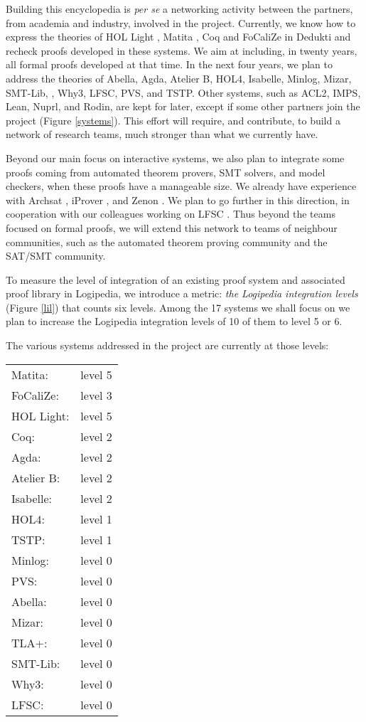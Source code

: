 Building this encyclopedia is {\em per se} a networking activity
between the partners, from academia and industry, involved in the
project.  Currently, we know how to express the theories of {\sc HOL
  Light} \cite{Assaf12}, {\sc Matita} \cite{Assaf15}, {\sc Coq} and
{\sc FoCaliZe} \cite{Cauderlier16} in {\sc Dedukti} and recheck proofs
developed in these systems.  We aim at including, in twenty years, all
formal proofs developed at that time.
In the next four years, we plan to address the theories of {\sc
  Abella}, {\sc Agda}, {\sc Atelier B}, {\sc HOL4}, {\sc Isabelle},
{\sc Minlog}, {\sc Mizar}, {\sc SMT-Lib}, \tlaplus, {\sc Why3}, {\sc
  LFSC}, {\sc PVS}, and {\sc TSTP}.  Other systems, such as {\sc
  ACL2}, {\sc IMPS}, {\sc Lean}, {\sc Nuprl}, and {\sc Rodin}, are
kept for later, except if some other partners join the project (Figure
\ref{systems}). This effort will require, and contribute, to build a
network of research teams, much stronger than what we currently have.

Beyond our main focus on interactive systems, we also plan to
integrate some proofs coming from automated theorem provers, SMT
solvers, and model checkers, when these proofs have a manageable
size. We already have experience with Archsat \cite{Bury19}, iProver
\cite{Burel10}, and Zenon \cite{CauderlierHalmagrand15}. We plan to go
further in this direction, in cooperation with our colleagues working
on LFSC \cite{Stump09}. Thus beyond the teams focused on formal proofs, we
will extend this network to teams of neighbour communities, such as
the automated theorem proving community and the SAT/SMT community.

To measure the level of integration of an existing proof system and
associated proof library in {\sc Logipedia}, we introduce a metric:
{\em the {\sc Logipedia} integration levels} (Figure \ref{lil}) that
counts six levels.  Among the 17 systems we shall focus on we plan to
increase the {\sc Logipedia} integration levels of 10 of them to level
5 or 6.

The various systems addressed in the project are currently at those levels:

\begin{tabular}{ll}
Matita:& level 5\\
FoCaliZe:& level 3\\
HOL Light:& level 5\\
Coq:& level 2\\
Agda:& level 2\\
Atelier B:& level 2\\
Isabelle:& level 2\\
HOL4:& level 1\\
TSTP:& level 1\\
Minlog:& level 0\\
PVS:& level 0\\
Abella:& level 0\\
Mizar:& level 0\\
TLA+:& level 0\\
SMT-Lib:& level 0\\
Why3:& level 0\\
LFSC:& level 0\\

\end{tabular}

